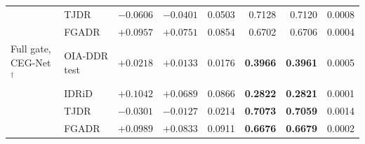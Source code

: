 \begin{table}[htbp]
{\begin{tabular}{llrrrrrr}
 & TJDR & $-0.0606$ & $-0.0401$ & 0.0503 & 0.7128 & 0.7120 & 0.0008 \\
 & FGADR & $+0.0957$ & $+0.0751$ & 0.0854 & 0.6702 & 0.6706 & 0.0004 \\
\midrule
Full gate, CEG-Net$^{\dagger}$ & OIA-DDR test & $+0.0218$ & $+0.0133$ & 0.0176 & \textbf{0.3966} & \textbf{0.3961} & 0.0005 \\
 & IDRiD & $+0.1042$ & $+0.0689$ & 0.0866 & \textbf{0.2822} & \textbf{0.2821} & 0.0001 \\
 & TJDR & $-0.0301$ & $-0.0127$ & 0.0214 & \textbf{0.7073} & \textbf{0.7059} & 0.0014 \\
 & FGADR & $+0.0989$ & $+0.0833$ & 0.0911 & \textbf{0.6676} & \textbf{0.6679} & 0.0002 \\
\bottomrule
\end{tabular}}
\par{}
\end{table}

